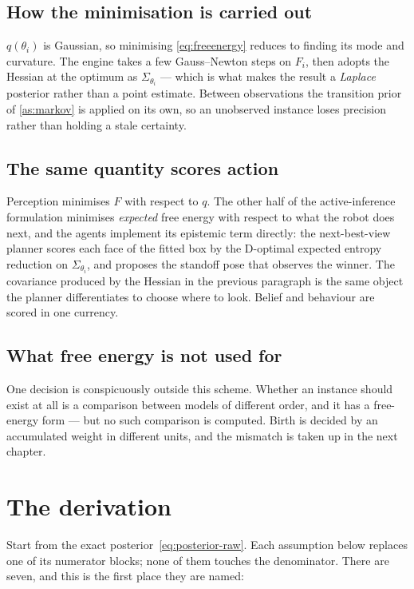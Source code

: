 \documentclass[11pt,a4paper]{report}
\theoremstyle{definition}   %
\begin{document}
\subsection{How the minimisation is carried out}

$q(\theta_i)$ is Gaussian, so minimising \eqref{eq:freeenergy} reduces to finding its mode and
curvature. The engine takes a few Gauss--Newton steps on $F_i$, then adopts the Hessian at the
optimum as $\Sigma_{\theta_i}$ --- which is what makes the result a \emph{Laplace} posterior rather
than a point estimate. Between observations the transition prior of \ref{as:markov} is applied on
its own, so an unobserved instance loses precision rather than holding a stale certainty.

\subsection{The same quantity scores action}

Perception minimises $F$ with respect to $q$. The other half of the active-inference formulation
minimises \emph{expected} free energy with respect to what the robot does next, and the agents
implement its epistemic term directly: the next-best-view planner scores each face of the fitted
box by the D-optimal expected entropy reduction on $\Sigma_{\theta_i}$, and proposes the standoff
pose that observes the winner. The covariance produced by the Hessian in the previous paragraph is
the same object the planner differentiates to choose where to look. Belief and behaviour are scored
in one currency.

\subsection{What free energy is not used for}

One decision is conspicuously outside this scheme. Whether an instance should exist at all is a
comparison between models of different order, and it has a free-energy form --- but no such
comparison is computed. Birth is decided by an accumulated weight in different units, and the
mismatch is taken up in the next chapter.

\section{The derivation}
\label{sec:derivation}

Start from the exact posterior~\eqref{eq:posterior-raw}. Each assumption below replaces one of its
numerator blocks; none of them touches the denominator. There are seven, and this is the first
place they are named:
\end{document}
